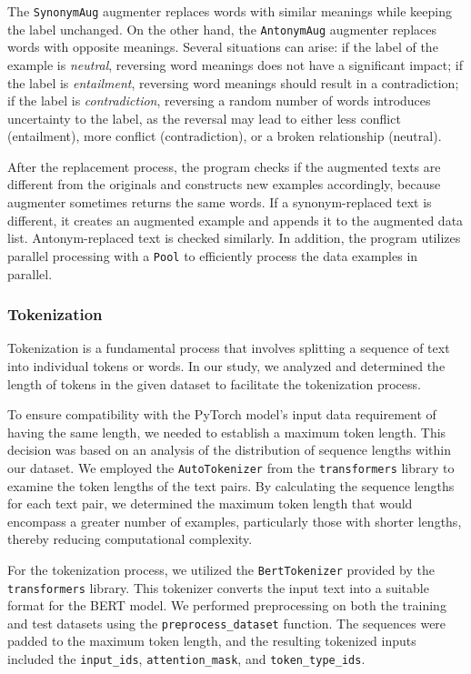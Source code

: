 \documentclass[11pt]{article}
\begin{document}
The \texttt{SynonymAug} augmenter replaces words with similar meanings while keeping the label unchanged. On the other hand, the \texttt{AntonymAug} augmenter replaces words with opposite meanings. Several situations can arise: if the label of the example is \textit{neutral}, reversing word meanings does not have a significant impact; if the label is \textit{entailment}, reversing word meanings should result in a contradiction; if the label is \textit{contradiction}, reversing a random number of words introduces uncertainty to the label, as the reversal may lead to either less conflict (entailment), more conflict (contradiction), or a broken relationship (neutral).

After the replacement process, the program checks if the augmented texts are different from the originals and constructs new examples accordingly, because augmenter sometimes returns the same words. If a synonym-replaced text is different, it creates an augmented example and appends it to the augmented data list. Antonym-replaced text is checked similarly. In addition, the program utilizes parallel processing with a \texttt{Pool} to efficiently process the data examples in parallel.

\subsubsection{Tokenization}

Tokenization is a fundamental process that involves splitting a sequence of text into individual tokens or words. In our study, we analyzed and determined the length of tokens in the given dataset to facilitate the tokenization process.

To ensure compatibility with the PyTorch model's input data requirement of having the same length, we needed to establish a maximum token length. This decision was based on an analysis of the distribution of sequence lengths within our dataset. We employed the \texttt{AutoTokenizer} from the \texttt{transformers} library to examine the token lengths of the text pairs. By calculating the sequence lengths for each text pair, we determined the maximum token length that would encompass a greater number of examples, particularly those with shorter lengths, thereby reducing computational complexity.

For the tokenization process, we utilized the \texttt{BertTokenizer} provided by the \texttt{transformers} library. This tokenizer converts the input text into a suitable format for the BERT model. We performed preprocessing on both the training and test datasets using the \texttt{preprocess\_dataset} function. The sequences were padded to the maximum token length, and the resulting tokenized inputs included the \texttt{input\_ids}, \texttt{attention\_mask}, and \texttt{token\_type\_ids}.
\end{document}
